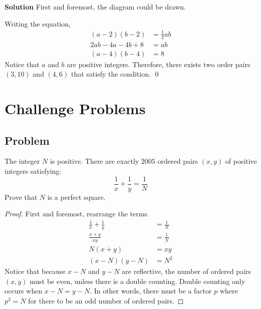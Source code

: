 \documentclass{article}
\newenvironment{solution}{\begin{trivlist}\item[]{\bf Solution}}{\qed \end{trivlist}}
\begin{document}
\begin{solution}
First and foremost, the diagram could be drawn.
\begin{center}
\end{center}
Writing the equation,
\begin{align*}
    (a - 2)(b - 2) &= \frac{1}{2}ab \\
    2ab - 4a - 4b + 8 &= ab \\
    (a - 4)(b - 4) &= 8
\end{align*}
Notice that $a$ and $b$ are positive integers.
Therefore, there exists $\boxed{\text{two}}$ order pairs
$(3, 10)$ and $(4, 6)$ that satisfy the condition.
\end{solution}

\section*{\textcolor{BrickRed}{Challenge Problems}}
\subsection*{Problem}
The integer $N$ is positive. There are exactly $2005$
ordered pairs $(x, y)$ of positive integers satisfying:
\[
\frac{1}{x} + \frac{1}{y} = \frac{1}{N}
\]
Prove that $N$ is a perfect square.
\begin{proof}
First and foremost, rearrange the terms.
\begin{align*}
    \frac{1}{x} + \frac{1}{y} &= \frac{1}{N} \\
    \frac{x + y}{xy} &= \frac{1}{N} \\
    N(x + y) &= xy \\
    (x - N)(y - N) &= N^2
\end{align*}
Notice that because $x - N$ and $y - N$ are reflective,
the number of ordered pairs $(x, y)$ must be even,
unless there is a double counting. Double counting
only occurs when $x - N = y - N$. In other words,
there must be a factor $p$ where $p^2 = N$ for there
to be an odd number of ordered pairs.
\end{proof}
\end{document}
